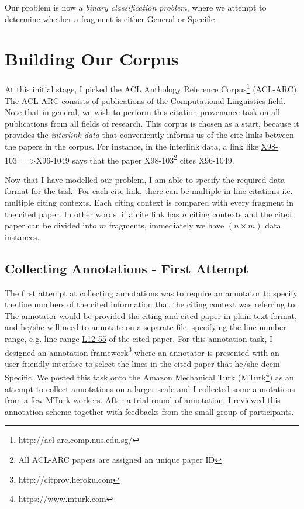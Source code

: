 Our problem is now a \textit{binary classification problem}, where we attempt to determine whether a fragment is either General or Specific.

\section{Building Our Corpus}
At this initial stage, I picked the ACL Anthology Reference Corpus\footnote{http://acl-arc.comp.nus.edu.sg/} (ACL-ARC). The ACL-ARC consists of publications of the Computational Linguistics field. Note that in general, we wish to perform this citation provenance task on all publications from all fields of research. This corpus is chosen as a start, because it provides the \textit{interlink data} that conveniently informs us of the cite links between the papers in the corpus. For instance, in the interlink data, a link like \url{X98-103==>X96-1049} says that the paper \url{X98-103}\footnote{All ACL-ARC papers are assigned an unique paper ID} cites \url{X96-1049}.

Now that I have modelled our problem, I am able to specify the required data format for the task. For each cite link, there can be multiple in-line citations i.e. multiple citing contexts. Each citing context is compared with every fragment in the cited paper. In other words, if a cite link has $n$ citing contexts and the cited paper can be divided into $m$ fragments, immediately we have $(n \times m)$ data instances.

\subsection{Collecting Annotations - First Attempt}
The first attempt at collecting annotations was to require an annotator to specify the line numbers of the cited information that the citing context was referring to. The annotator would be provided the citing and cited paper in plain text format, and he/she will need to annotate on a separate file, specifying the line number range, e.g. line range \url{L12-55} of the cited paper. For this annotation task, I designed an annotation framework\footnote{http://citprov.heroku.com} where an annotator is presented with an user-friendly interface to select the lines in the cited paper that he/she deem Specific. We posted this task onto the Amazon Mechanical Turk (MTurk\footnote{https://www.mturk.com}) as an attempt to collect annotations on a larger scale and I collected some annotations from a few MTurk workers. After a trial round of annotation, I reviewed this annotation scheme together with feedbacks from the small group of participants.

